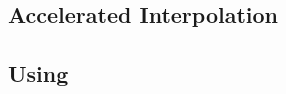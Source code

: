 
\begin{comment}
	\jw{Accelerated Interpolation as an extension of trace abstraction is introduced $\rightarrow$ Show how to utilize loop summaries within trace abstraction \\
	- Error traces  $\rightarrow$ loop relations  $\rightarrow$ reflexive transitive closures  $\rightarrow$ meta traces  $\rightarrow$ interpolation on meta traces \\
	- "We implemented accelerated interpolation in an earlier project using a myriad of loop summarization techniques... " $\rightarrow$ Introduce various loop summarization techniques (FastUPR, Jordan, Werner) NOT in-depth, only their ideas, but show their pros and cons  $\rightarrow$ The cons build a bridge to the next chapter \\
	- running example will be transformed to a meta trace WITHOUT actual loop summarizations on edges \\
	\vspace{1cm}
	22 pages $\rightarrow$ recycled from earlier}
\end{comment}

\subsection{Accelerated Interpolation}


\subsection{Using \qvasr}